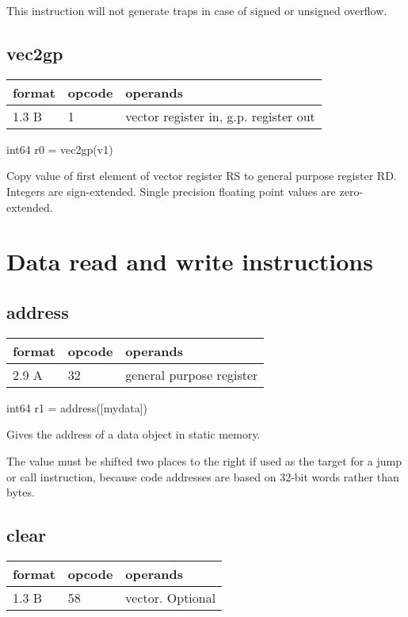 \documentclass[forwardcom.tex]{subfiles}
\begin{document}
This instruction will not generate traps in case of signed or unsigned overflow.
\vv


\subsection{vec2gp}
\label{table:vec2gpInstruction}
\begin{tabular}{|p{12mm}|p{15mm}|p{100mm}|}
\hline
\bfseries format & \bfseries opcode & \bfseries operands \\ \hline
1.3 B & 1 & vector register in, g.p. register out \\ \hline
\end{tabular}
\vv

int64 r0 = vec2gp(v1)
\vv

Copy value of first element of vector register RS to general purpose register RD. Integers are sign-extended. Single precision floating point values are zero-extended.
\vv


\section{Data read and write instructions}
\vv

\subsection{address}
\label{table:addressInstruction}
\begin{tabular}{|p{12mm}|p{15mm}|p{100mm}|}
\hline
\bfseries format & \bfseries opcode & \bfseries operands \\ \hline
2.9 A & 32 & general purpose register \\ \hline
\end{tabular}
\vv

int64 r1 = address([mydata])
\vv

Gives the address of a data object in static memory.
\vv

The value must be shifted two places to the right if used as the target for a jump or call instruction, because code addresses are based on 32-bit words rather than bytes.
\vv

\subsection{clear}
\label{table:clearInstruction}
\begin{tabular}{|p{12mm}|p{15mm}|p{100mm}|}
\hline
\bfseries format & \bfseries opcode & \bfseries operands \\ \hline
1.3 B & 58 & vector. Optional \\ \hline
\end{tabular}
\vv
\end{document}
